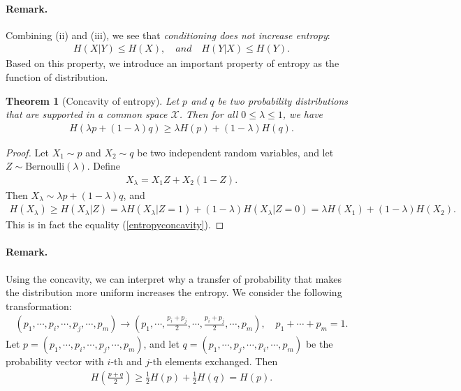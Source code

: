 \documentclass{article}
\numberwithin{equation}{section}
\theoremstyle{plain}
\newtheorem{theorem}{Theorem}[section]
\theoremstyle{definition}
\begin{document}
\paragraph{Remark.} Combining (ii) and (iii), we see that \textit{conditioning does not increase entropy}:
\begin{align*}
	H(X|Y)\leq H(X),\quad and\quad H(Y|X)\leq H(Y).
\end{align*}
Based on this property, we introduce an important property of entropy as the function of distribution.
\begin{theorem}[Concavity of entropy]\label{thm:1.5}
	Let $p$ and $q$ be two probability distributions that are supported in a common space $\mathcal{X}$. Then for all $0\leq\lambda\leq 1$, we have
	\begin{align}
		H(\lambda p+(1-\lambda)q)\geq\lambda H(p)+(1-\lambda)H(q).\label{entropyconcavity}
	\end{align}
\end{theorem}
\begin{proof}
Let $X_1\sim p$ and $X_2\sim q$ be two independent random variables, and let $Z\sim\mathrm{Bernoulli}(\lambda)$. Define
\begin{align*}
	X_\lambda=X_1Z+X_2(1-Z).
\end{align*}
Then $X_\lambda\sim \lambda p+(1-\lambda)q$, and
\begin{align*}
	H(X_\lambda)\geq H(X_\lambda|Z)=\lambda H(X_\lambda|Z=1)+(1-\lambda)H(X_\lambda|Z=0)=\lambda H(X_1)+(1-\lambda)H(X_2).
\end{align*}
This is in fact the equality (\ref{entropyconcavity}).
\end{proof}
\paragraph{Remark.} Using the concavity, we can interpret why a transfer of probability that makes the distribution more uniform increases the entropy. We consider the following transformation:
\begin{align*}
	(p_1,\cdots,p_i,\cdots,p_j,\cdots,p_m)\to\left(p_1,\cdots,\frac{p_i+p_j}{2},\cdots,\frac{p_i+p_j}{2},\cdots,p_m\right),\quad p_1+\cdots+p_m=1.
\end{align*}
Let $p=(p_1,\cdots,p_i,\cdots,p_j,\cdots,p_m)$, and let $q=(p_1,\cdots,p_j,\cdots,p_i,\cdots,p_m)$ be the probability vector with $i$-th and $j$-th elements exchanged. Then
\begin{align*}
	H\left(\frac{p+q}{2}\right)\geq\frac{1}{2}H(p)+\frac{1}{2}H(q)= H(p).
\end{align*}
\end{document}
